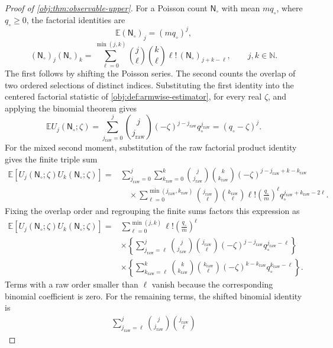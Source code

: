 \begin{proof}[Proof of \cref{obj:thm:observable-upper}]
For a Poisson count \(\mathsf N_\circ\) with mean \(m q_\circ\), where \(q_\circ\ge0\), the factorial identities are
\[
\mathbb E(\mathsf N_\circ)_j=(m q_\circ)^j,
\]
\[
(\mathsf N_\circ)_j(\mathsf N_\circ)_k
=
\sum_{\ell=0}^{\min(j,k)}
\binom j\ell\binom k\ell\ell!\,
(\mathsf N_\circ)_{j+k-\ell},
\qquad j,k\in\mathbb N.
\]
The first follows by shifting the Poisson series. The second counts the overlap of two ordered selections of distinct indices. Substituting the first identity into the centered factorial statistic of \cref{obj:def:armwise-estimator}, for every real \(\zeta\), and applying the binomial theorem gives
\[
\mathbb E U_j(\mathsf N_\circ;\zeta)
=
\sum_{j_{\mathrm{raw}}=0}^{j}
\binom j{j_{\mathrm{raw}}}(-\zeta)^{j-j_{\mathrm{raw}}}
q_\circ^{j_{\mathrm{raw}}}
=(q_\circ-\zeta)^j.
\]
For the mixed second moment, substitution of the raw factorial product identity gives the finite triple sum
\[
\begin{aligned}
\mathbb E[U_j(\mathsf N_\circ;\zeta)U_k(\mathsf N_\circ;\zeta)]
={}&
\sum_{j_{\mathrm{raw}}=0}^{j}
\sum_{k_{\mathrm{raw}}=0}^{k}
\binom j{j_{\mathrm{raw}}}\binom k{k_{\mathrm{raw}}}
(-\zeta)^{j-j_{\mathrm{raw}}+k-k_{\mathrm{raw}}}\\
&\quad\times
\sum_{\ell=0}^{\min(j_{\mathrm{raw}},k_{\mathrm{raw}})}
\binom{j_{\mathrm{raw}}}\ell
\binom{k_{\mathrm{raw}}}\ell\ell!
\left(\frac{q_\circ}{m}\right)^\ell
q_\circ^{j_{\mathrm{raw}}+k_{\mathrm{raw}}-2\ell}.
\end{aligned}
\]
Fixing the overlap order and regrouping the finite sums factors this expression as
\[
\begin{aligned}
\mathbb E[U_j(\mathsf N_\circ;\zeta)U_k(\mathsf N_\circ;\zeta)]
={}&\sum_{\ell=0}^{\min(j,k)}
\ell!\left(\frac{q_\circ}{m}\right)^\ell\\
&\times\left\{
\sum_{j_{\mathrm{raw}}=\ell}^{j}
\binom j{j_{\mathrm{raw}}}\binom{j_{\mathrm{raw}}}\ell
(-\zeta)^{j-j_{\mathrm{raw}}}
q_\circ^{j_{\mathrm{raw}}-\ell}
\right\}\\
&\times\left\{
\sum_{k_{\mathrm{raw}}=\ell}^{k}
\binom k{k_{\mathrm{raw}}}\binom{k_{\mathrm{raw}}}\ell
(-\zeta)^{k-k_{\mathrm{raw}}}
q_\circ^{k_{\mathrm{raw}}-\ell}
\right\}.
\end{aligned}
\]
Terms with a raw order smaller than \(\ell\) vanish because the corresponding binomial coefficient is zero. For the remaining terms, the shifted binomial identity is
\[
\begin{aligned}
\sum_{j_{\mathrm{raw}}=\ell}^{j}
\binom j{j_{\mathrm{raw}}}\binom{j_{\mathrm{raw}}}\ell

\end{aligned}\]
\end{proof}
